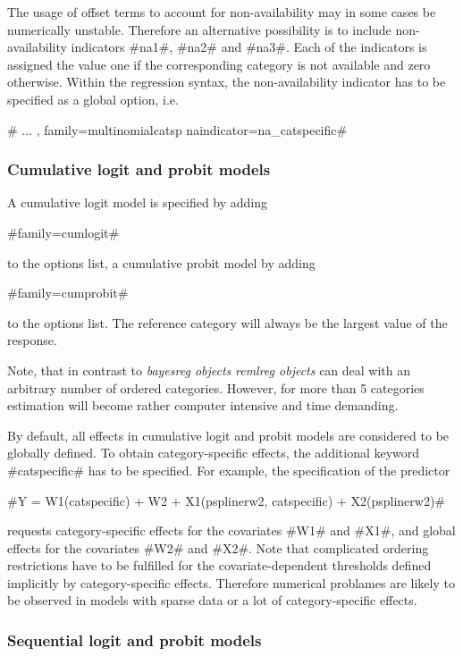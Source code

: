 The usage of offset terms to account for non-availability may in
some cases be numerically unstable. Therefore an alternative
possibility is to include non-availability indicators #na1#, #na2#
and #na3#. Each of the indicators is assigned the value one if the
corresponding category is not available and zero otherwise. Within
the regression syntax, the non-availability indicator has to be
specified as a global option, i.e.

# ... , family=multinomialcatsp naindicator=na_catspecific#


\subsubsection*{Cumulative logit and probit models}

A cumulative logit model is specified by adding

#family=cumlogit#

to the options list, a cumulative probit model by adding

#family=cumprobit#

to the options list. The reference category will always be the
largest value of the response.

Note, that in contrast to {\em bayesreg objects} {\em remlreg
objects} can deal with an arbitrary number of ordered categories.
However, for more than 5 categories estimation will become rather
computer intensive and time demanding.

By default, all effects in cumulative logit and probit models are
considered to be globally defined. To obtain category-specific
effects, the additional keyword #catspecific# has to be specified.
For example, the specification of the predictor

 #Y = W1(catspecific) + W2 + X1(psplinerw2, catspecific) + X2(psplinerw2)#

requests category-specific effects for the covariates #W1# and #X1#,
and global effects for the covariates #W2# and #X2#. Note that
complicated ordering restrictions have to be fulfilled for the
covariate-dependent thresholds defined implicitly by
category-specific effects. Therefore numerical problames are likely
to be observed in models with sparse data or a lot of
category-specific effects.

\subsubsection*{Sequential logit and probit models}

